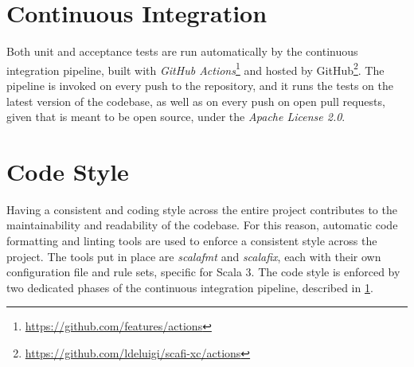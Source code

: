 \section{Continuous Integration} \label{chap:evaluation->sec:continuous-integration}

Both unit and acceptance tests are run automatically by the continuous integration pipeline, built with \textit{GitHub Actions}\footnote{\url{https://github.com/features/actions}} and hosted by GitHub\footnote{\url{https://github.com/ldeluigi/scafi-xc/actions}}.
%
The pipeline is invoked on every push to the repository, and it runs the tests on the latest version of the codebase, as well as on every push on open pull requests, given that \this is meant to be open source, under the \textit{Apache License 2.0}.

\section{Code Style} \label{chap:evaluation->sec:code-style}

Having a consistent and  coding style across the entire project contributes to the maintainability and readability of the codebase.
%
For this reason, automatic code formatting and linting tools are used to enforce a consistent style across the project.
%
The tools put in place are \textit{scalafmt} and \textit{scalafix}, each with their own configuration file and rule sets, specific for Scala 3.
%
The code style is enforced by two dedicated phases of the continuous integration pipeline, described in \cref{chap:evaluation->sec:continuous-integration}.
